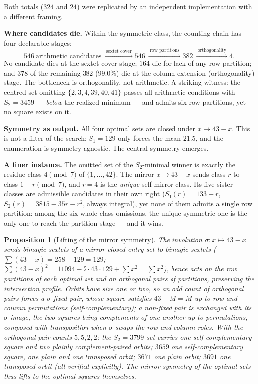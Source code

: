 \documentclass[11pt]{article}
\newtheorem{proposition}[theorem]{Proposition}
\begin{document}
Both totals ($324$ and $24$) were replicated by an independent
implementation with a different framing.

\medskip
\noindent\textbf{Where candidates die.} Within the symmetric class, the
counting chain has four declarable stages:
\[
546 \ \text{arithmetic candidates}
\ \xrightarrow{\ \text{sextet cover}\ } 546
\ \xrightarrow{\ \text{row partitions}\ } 382
\ \xrightarrow{\ \text{orthogonality}\ } 4 .
\]
No candidate dies at the sextet-cover stage; $164$ die for lack of any
row partition; and $378$ of the remaining $382$ ($99.0\%$) die at the
column-extension (orthogonality) stage. The bottleneck is orthogonality,
not arithmetic. A striking witness: the centred set omitting
$\{2,3,4,39,40,41\}$ passes all arithmetic conditions with
$S_2=3459$ --- \emph{below} the realized minimum --- and admits six row
partitions, yet no square exists on it.

\medskip
\noindent\textbf{Symmetry as output.} All four optimal sets are closed
under $x\mapsto 43-x$. This is not a filter of the search: $S_1=129$
only forces the mean $21.5$, and the enumeration is symmetry-agnostic.
The central symmetry emerges.

\medskip
\noindent\textbf{A finer instance.} The omitted set of the
$S_2$-minimal winner is exactly the residue class $4\pmod 7$ of
$\{1,\dots,42\}$. The mirror $x\mapsto 43-x$ sends class $r$ to class
$1-r\pmod 7$, and $r=4$ is the \emph{unique} self-mirror class. Its
five sister classes are admissible candidates in their own right
($S_1(r)=133-r$, $S_2(r)=3815-35r-r^2$, always integral), yet none of
them admits a single row partition: among the six whole-class
omissions, the unique symmetric one is the only one to reach the
partition stage --- and it wins.

\begin{proposition}[Lifting of the mirror symmetry]\label{prop:lift}
The involution $\sigma:x\mapsto 43-x$ sends bimagic sextets of a
mirror-closed entry set to bimagic sextets
($\textstyle\sum(43-x)=258-129=129$;
$\sum(43-x)^2=11094-2\cdot 43\cdot 129+\sum x^2=\sum x^2$), hence acts
on the row partitions of each optimal set and on orthogonal pairs of
partitions, preserving the intersection profile. Orbits have size one
or two, so an odd count of orthogonal pairs forces a $\sigma$-fixed
pair, whose square satisfies $43-M=M$ up to row and column
permutations (\emph{self-complementary}); a non-fixed pair is
exchanged with its $\sigma$-image, the two squares being complements
of one another up to permutations, composed with transposition when
$\sigma$ swaps the row and column roles. With the orthogonal-pair
counts $5,5,2,2$: the $S_2=3799$ set carries one self-complementary
square and two plainly complement-paired orbits; $3659$ one
self-complementary square, one plain and one transposed orbit; $3671$
one plain orbit; $3691$ one transposed orbit (all verified
explicitly). The mirror symmetry of the optimal sets thus lifts to the
optimal squares themselves.
\end{proposition}
\end{document}
